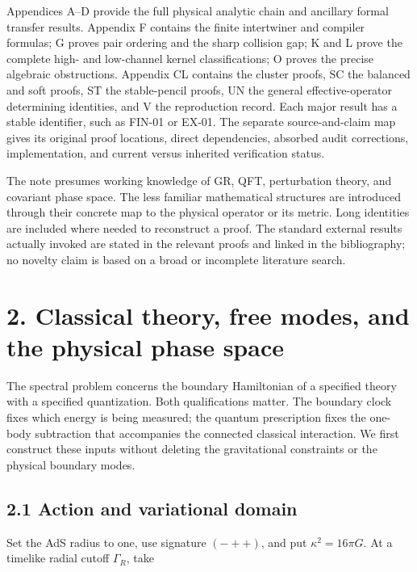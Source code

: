 \documentclass[a4paper,11pt]{article}
\numberwithin{equation}{section}
\begin{document}
Appendices A--D provide the full physical analytic chain and ancillary formal transfer results. Appendix F contains the finite intertwiner and compiler formulas; G proves pair ordering and the sharp collision gap; K and L prove the complete high- and low-channel kernel classifications; O proves the precise algebraic obstructions. Appendix CL contains the cluster proofs, SC the balanced and soft proofs, ST the stable-pencil proofs, UN the general effective-operator determining identities, and V the reproduction record. Each major result has a stable identifier, such as FIN-01 or EX-01. The separate source-and-claim map gives its original proof locations, direct dependencies, absorbed audit corrections, implementation, and current versus inherited verification status.

The note presumes working knowledge of GR, QFT, perturbation theory, and covariant phase space. The less familiar mathematical structures are introduced through their concrete map to the physical operator or its metric. Long identities are included where needed to reconstruct a proof. The standard external results actually invoked are stated in the relevant proofs and linked in the bibliography; no novelty claim is based on a broad or incomplete literature search.

\clearpage
\hypertarget{classical-theory-free-modes-and-the-physical-phase-space}{%
\section{2. Classical theory, free modes, and the physical phase space}\label{classical-theory-free-modes-and-the-physical-phase-space}}

The spectral problem concerns the boundary Hamiltonian of a specified theory with a specified quantization. Both qualifications matter. The boundary clock fixes which energy is being measured; the quantum prescription fixes the one-body subtraction that accompanies the connected classical interaction. We first construct these inputs without deleting the gravitational constraints or the physical boundary modes.

\hypertarget{action-and-variational-domain}{%
\subsection{2.1 Action and variational domain}\label{action-and-variational-domain}}

Set the AdS radius to one, use signature \((-++)\), and put \(\kappa^2=16\pi G\). At a timelike radial cutoff \(\Gamma_R\), take
\end{document}
